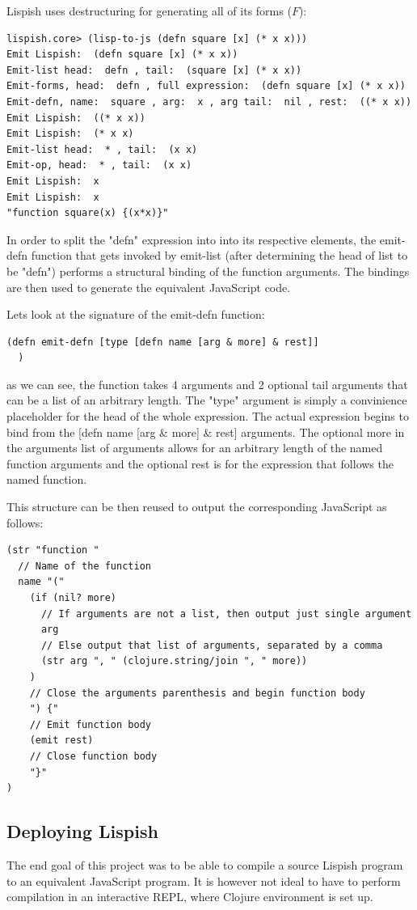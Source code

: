 Lispish uses destructuring for generating all of its forms ($F$):
\begin{verbatim}
lispish.core> (lisp-to-js (defn square [x] (* x x)))
Emit Lispish:  (defn square [x] (* x x))
Emit-list head:  defn , tail:  (square [x] (* x x))
Emit-forms, head:  defn , full expression:  (defn square [x] (* x x))
Emit-defn, name:  square , arg:  x , arg tail:  nil , rest:  ((* x x))
Emit Lispish:  ((* x x))
Emit Lispish:  (* x x)
Emit-list head:  * , tail:  (x x)
Emit-op, head:  * , tail:  (x x)
Emit Lispish:  x
Emit Lispish:  x
"function square(x) {(x*x)}"
\end{verbatim}

In order to split the "defn" expression into into its respective elements, the emit-defn function that gets invoked by emit-list (after determining the head of list to be "defn") performs a structural binding of the function arguments. The bindings are then used to generate the equivalent JavaScript code. 

Lets look at the signature of the emit-defn function:
\begin{verbatim}
(defn emit-defn [type [defn name [arg & more] & rest]]
  )
\end{verbatim}
as we can see, the function takes 4 arguments and 2 optional tail arguments that can be a list of an arbitrary length. The "type" argument is simply a convinience placeholder for the head of the whole expression.
The actual expression begins to bind from the [defn name [arg \& more] \& rest] arguments. 
The optional more in the arguments list of arguments allows for an arbitrary length of the named function arguments and the optional rest is for the expression that follows the named function.

This structure can be then reused to output the corresponding JavaScript as follows:

\begin{verbatim}
(str "function "
  // Name of the function 
  name "("
    (if (nil? more) 
      // If arguments are not a list, then output just single argument
      arg 
      // Else output that list of arguments, separated by a comma
      (str arg ", " (clojure.string/join ", " more))
    )
    // Close the arguments parenthesis and begin function body
    ") {"
    // Emit function body
    (emit rest)
    // Close function body
    "}"
)
\end{verbatim}

\subsection{Deploying Lispish}
The end goal of this project was to be able to compile a source Lispish program to an equivalent JavaScript program.
It is however not ideal to have to perform compilation in an interactive REPL, where Clojure environment is set up. 

